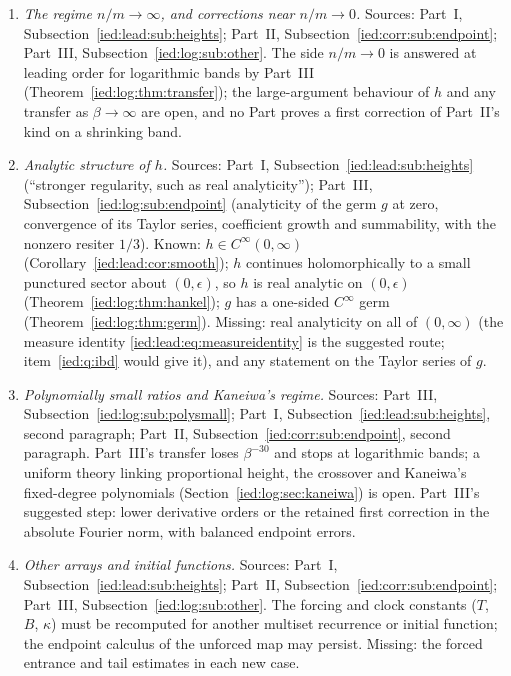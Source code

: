 \documentclass[11pt,letterpaper]{article}
\theoremstyle{remark}\newtheorem{remark}[theorem]{Remark}
\begin{document}
\begin{enumerate}[label=\arabic*.,ref=\arabic*,leftmargin=*,itemsep=4pt]
\item\label{ied:q:endpoint} \emph{The regime $n/m\to\infty$, and corrections near $n/m\to0$.} Sources: Part~I, Subsection~\ref{ied:lead:sub:heights}; Part~II, Subsection~\ref{ied:corr:sub:endpoint}; Part~III, Subsection~\ref{ied:log:sub:other}. The side $n/m\to0$ is answered at leading order for logarithmic bands by Part~III (Theorem~\ref{ied:log:thm:transfer}); the large-argument behaviour of $h$ and any transfer as $\beta\to\infty$ are open, and no Part proves a first correction of Part~II's kind on a shrinking band.
\item\label{ied:q:analytic} \emph{Analytic structure of $h$.} Sources: Part~I, Subsection~\ref{ied:lead:sub:heights} (``stronger regularity, such as real analyticity''); Part~III, Subsection~\ref{ied:log:sub:endpoint} (analyticity of the germ $g$ at zero, convergence of its Taylor series, coefficient growth and summability, with the nonzero resiter $1/3$). Known: $h\in C^\infty(0,\infty)$ (Corollary~\ref{ied:lead:cor:smooth}); $h$ continues holomorphically to a small punctured sector about $(0,\epsilon)$, so $h$ is real analytic on $(0,\epsilon)$ (Theorem~\ref{ied:log:thm:hankel}); $g$ has a one-sided $C^\infty$ germ (Theorem~\ref{ied:log:thm:germ}). Missing: real analyticity on all of $(0,\infty)$ (the measure identity \eqref{ied:lead:eq:measureidentity} is the suggested route; item~\ref{ied:q:ibd} would give it), and any statement on the Taylor series of $g$.
\item\label{ied:q:polysmall} \emph{Polynomially small ratios and Kaneiwa's regime.} Sources: Part~III, Subsection~\ref{ied:log:sub:polysmall}; Part~I, Subsection~\ref{ied:lead:sub:heights}, second paragraph; Part~II, Subsection~\ref{ied:corr:sub:endpoint}, second paragraph. Part~III's transfer loses $\beta^{-30}$ and stops at logarithmic bands; a uniform theory linking proportional height, the crossover and Kaneiwa's fixed-degree polynomials (Section~\ref{ied:log:sec:kaneiwa}) is open. Part~III's suggested step: lower derivative orders or the retained first correction in the absolute Fourier norm, with balanced endpoint errors.
\item\label{ied:q:other} \emph{Other arrays and initial functions.} Sources: Part~I, Subsection~\ref{ied:lead:sub:heights}; Part~II, Subsection~\ref{ied:corr:sub:endpoint}; Part~III, Subsection~\ref{ied:log:sub:other}. The forcing and clock constants ($T$, $B$, $\kappa$) must be recomputed for another multiset recurrence or initial function; the endpoint calculus of the unforced map may persist. Missing: the forced entrance and tail estimates in each new case.

\end{enumerate}
\end{document}
